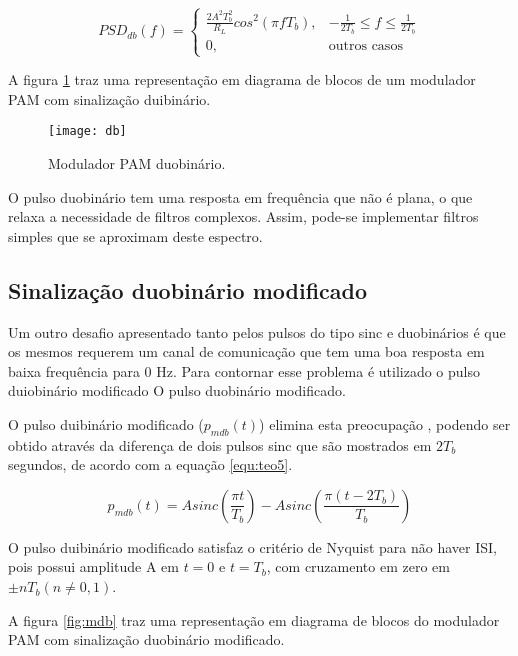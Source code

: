 \begin{equation}
  \label{equ:teo4}
  PSD_{db}(f) = 
  \begin{cases}
    \frac{2A^2T_b^2}{R_L}cos^2	(\pi f T_b), & -\frac{1}{2T_b} \leq f \leq 
    \frac{1}{2T_b} \\
    0, & \mbox{outros casos} 
  \end{cases}
\end{equation}

A figura \ref{fig:db} traz uma representação em diagrama de blocos de um 
modulador PAM com sinalização duibinário.

\begin{figure}[H]
    \centering
    \caption{Modulador PAM duobinário.}
    \texttt{[image: db]}
    \label{fig:db}
\end{figure}

O pulso duobinário tem uma resposta em frequência que não é plana, o que relaxa 
a necessidade de filtros complexos. Assim, pode-se implementar filtros simples 
que se aproximam deste espectro.

\subsection{Sinalização duobinário modificado}

Um outro desafio apresentado tanto pelos pulsos do tipo sinc e duobinários é 
que os mesmos requerem um canal de comunicação que tem uma boa resposta em 
baixa frequência para 0 Hz. Para contornar esse problema é utilizado o pulso 
duiobinário modificado O pulso duobinário modificado. 

O pulso duibinário modificado ($p_{mdb}(t)$) elimina esta preocupação 
\cite{Carlson,Proakis}, podendo ser obtido através da diferença de dois pulsos 
sinc que são mostrados em $2T_b$ segundos, de acordo com a equação 
\ref{equ:teo5}. 

\begin{equation}
\label{equ:teo5}
  p_{mdb}(t) = Asinc \left( \frac{\pi t }{T_b} \right) - Asinc \left( \frac{\pi 
    (t - 2T_b) }{T_b} \right)
\end{equation}

O pulso duibinário modificado satisfaz o critério de Nyquist para não haver 
ISI, pois possui amplitude A em $t=0$ e $t=T_b$, com cruzamento em zero em $\pm 
nT_b (n\neq 0,1)$.

A figura \ref{fig:mdb} traz uma representação em diagrama de blocos do 
modulador PAM com sinalização duobinário modificado.

